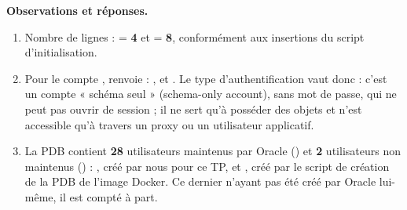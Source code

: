 \textbf{Observations et réponses.}
\begin{enumerate}
  \item Nombre de lignes :  = \textbf{4} et  = \textbf{8}, conformément
        aux insertions du script d'initialisation.
  \item Pour le compte ,  renvoie : ,
         et . Le type d'authentification vaut
        donc \textbf{} : c'est un compte « schéma seul » (schema-only account), sans mot de
        passe, qui ne peut pas ouvrir de session ; il ne sert qu'à posséder des objets et n'est
        accessible qu'à travers un proxy ou un utilisateur applicatif.
  \item La PDB contient \textbf{28} utilisateurs maintenus par Oracle ()
        et \textbf{2} utilisateurs non maintenus () : , créé par nous pour ce TP, et
        , créé par le script de création de la PDB de l'image Docker. Ce dernier n'ayant
        pas été créé par Oracle lui-même, il est compté à part.
\end{enumerate}

